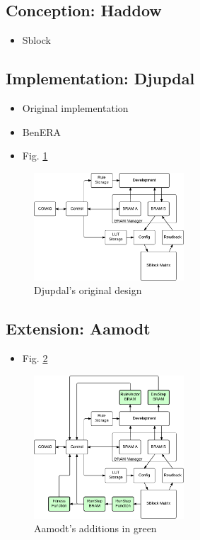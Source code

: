 \subsection{Conception: Haddow \cite{haddow2000sblock}}

\begin{itemize}
    \item Sblock
\end{itemize}

\subsection{Implementation: Djupdal \cite{djupdal2003sblock}}

\begin{itemize}
    \item Original implementation
    \item BenERA
    \item Fig. \ref{fig:overview-djupdal}
\end{itemize}

\begin{figure}[!ht]
    \centering
    \includegraphics[width=0.5\textwidth]{figures/overview-djupdal}
    \caption{Djupdal's original design}
    \label{fig:overview-djupdal}
\end{figure}

\subsection{Extension: Aamodt \cite{aamodt2005sblock}}

\begin{itemize}
    \item Fig. \ref{fig:overview-aamodt}
\end{itemize}

\begin{figure}[!ht]
    \centering
    \includegraphics[width=0.5\textwidth]{figures/overview-aamodt}
    \caption{Aamodt's additions in green}
    \label{fig:overview-aamodt}
\end{figure}

